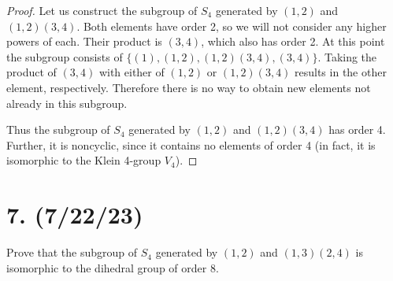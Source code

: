 \documentclass{article}
\begin{document}
\begin{proof}
    Let us construct the subgroup of $S_4$ generated by $(1, 2)$ and $(1, 2)(3, 4)$. Both elements have order 2, so we will not consider any higher powers of each. Their product is $(3, 4)$, which also has order 2. At this point the subgroup consists of $\{ (1), (1, 2), (1, 2)(3, 4), (3, 4) \}$. Taking the product of $(3, 4)$ with either of $(1, 2)$ or $(1, 2)(3, 4)$ results in the other element, respectively. Therefore there is no way to obtain new elements not already in this subgroup.

    Thus the subgroup of $S_4$ generated by $(1, 2)$ and $(1, 2)(3, 4)$ has order 4. Further, it is noncyclic, since it contains no elements of order 4 (in fact, it is isomorphic to the Klein 4-group $V_4$).
\end{proof}

\section*{7. (7/22/23)}

Prove that the subgroup of $S_4$ generated by $(1, 2)$ and $(1, 3)(2, 4)$ is isomorphic to the dihedral group of order 8.
\end{document}
